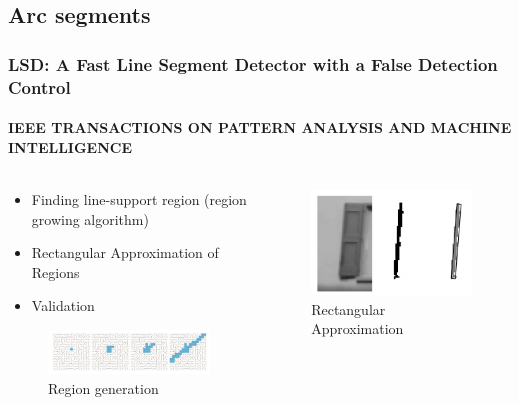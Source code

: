 \documentclass{beamer}
\begin{document}
    \subsection{Arc segments}
    \begin{frame}
        \frametitle{LSD: A Fast Line Segment Detector with a False Detection Control}
        \framesubtitle{IEEE TRANSACTIONS ON PATTERN ANALYSIS AND MACHINE INTELLIGENCE}
        \begin{columns}
            \begin{column}{.5\linewidth}
                \begin{itemize}
                    \item Finding line-support region (region growing algorithm)
                    \item Rectangular Approximation of Regions
                    \item Validation
                \end{itemize}
                \begin{figure}
                    \includegraphics[width=\linewidth]{pic/region.png}
                    \caption{Region generation}
                \end{figure}
            \end{column}
            \begin{column}{.5\linewidth}
                
                \begin{figure}
                    \includegraphics[width=.5\linewidth]{pic/rect.png}
                    \caption{Rectangular Approximation}
                \end{figure}
            \end{column}
        \end{columns}
    \end{frame}
\end{document}
